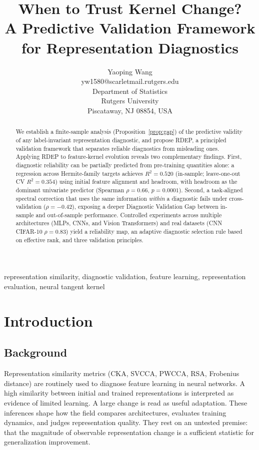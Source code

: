 \documentclass[twoside,11pt]{article}
\title{When to Trust Kernel Change?\\A Predictive Validation Framework for Representation Diagnostics}
\author{
  \name Yaoping Wang \\
  \email yw1580@scarletmail.rutgers.edu \\
  \addr Department of Statistics \\
  \addr Rutgers University \\
  \addr Piscataway, NJ 08854, USA
}
\begin{document}
\maketitle

\begin{abstract}
We establish a finite-sample analysis (Proposition~\ref{prop:gap}) of the predictive validity of any label-invariant representation diagnostic, and propose RDEP, a principled validation framework that separates reliable diagnostics from misleading ones. Applying RDEP to feature-kernel evolution reveals two complementary findings. First, diagnostic reliability can be partially predicted from pre-training quantities alone: a regression across Hermite-family targets achieves $R^2=0.520$ (in-sample; leave-one-out CV $R^2=0.354$) using initial feature alignment and headroom, with headroom as the dominant univariate predictor (Spearman $\rho=0.66$, $p=0.0001$). Second, a task-aligned spectral correction that uses the same information \emph{within} a diagnostic fails under cross-validation ($\rho=-0.42$), exposing a deeper Diagnostic Validation Gap between in-sample and out-of-sample performance. Controlled experiments across multiple architectures (MLPs, CNNs, and Vision Transformers) and real datasets (CNN CIFAR-10 $\rho=0.83$) yield a reliability map, an adaptive diagnostic selection rule based on effective rank, and three validation principles.
\end{abstract}
\begin{keywords}
representation similarity, diagnostic validation, feature learning, representation evaluation, neural tangent kernel
\end{keywords}

\section{Introduction}
\label{sec:intro}

\subsection{Background}

Representation similarity metrics (CKA, SVCCA, PWCCA, RSA, Frobenius distance) are routinely used to diagnose feature learning in neural networks. A high similarity between initial and trained representations is interpreted as evidence of limited learning. A large change is read as useful adaptation. These inferences shape how the field compares architectures, evaluates training dynamics, and judges representation quality. They rest on an untested premise: that the magnitude of observable representation change is a sufficient statistic for generalization improvement.
\end{document}
